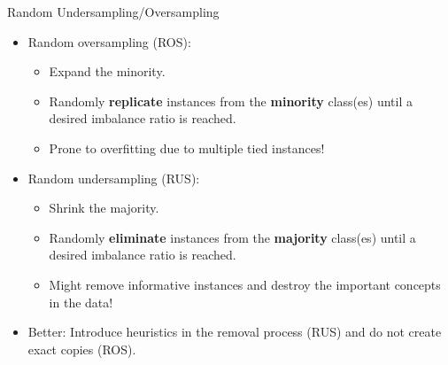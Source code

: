 \documentclass[11pt,compress,t,notes=noshow, xcolor=table]{beamer}
\begin{document}
	\begin{frame}{Random Undersampling/Oversampling}
		\begin{small}
		\begin{itemize}
            \item Random oversampling (ROS):
            \begin{itemize}
                \item Expand the minority.
                \item Randomly \textbf{replicate} instances from the \textbf{minority} class(es) until a desired imbalance ratio is reached.
                \item Prone to overfitting due to multiple tied instances!
            \end{itemize}

            \item Random undersampling (RUS):
            \begin{itemize}
                \item Shrink the majority.
                \item Randomly \textbf{eliminate} instances from the \textbf{majority} class(es) until a desired imbalance ratio is reached.
                \item Might remove informative instances and destroy the important concepts in the data!
            \end{itemize}
	
			\item Better: Introduce heuristics in the removal process (RUS) and do not create exact copies (ROS).
		
			\end{itemize}
		\end{small}	

	\end{frame}
	
\end{document}
